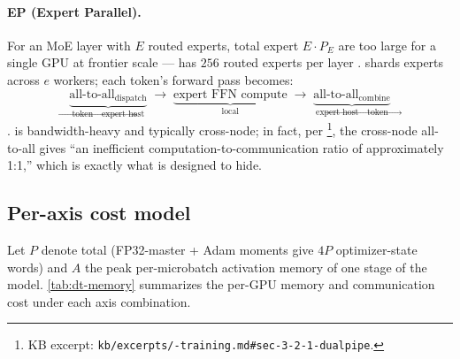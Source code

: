 \paragraph{EP (Expert Parallel).} For an MoE layer with $E$ routed
experts, total expert  $E \cdot P_E$ are too large for a
single GPU at frontier scale ---  has $256$ routed experts
per layer \citep[\S 3.2]{deepseek-v3}.  shards experts across $e$
workers; each token's forward pass becomes:
\begin{equation}
\underbrace{\text{all-to-all}_{\text{dispatch}}}_{\text{token}\to\text{expert host}}
\;\to\;
\underbrace{\text{expert FFN compute}}_{\text{local}}
\;\to\;
\underbrace{\text{all-to-all}_{\text{combine}}}_{\text{expert host}\to\text{token}}
\label{eq:ep-pattern}
\end{equation}
\citep[\S 3.2; \S 3.2.2]{deepseek-v3}.  is bandwidth-heavy and
typically cross-node; in fact, per
\citet[\S 3.2.1]{deepseek-v3}\footnote{KB excerpt:
\texttt{kb/excerpts/-training.md\#sec-3-2-1-dualpipe}.}, the
cross-node  all-to-all gives  ``an inefficient
computation-to-communication ratio of approximately 1:1,'' which is
exactly what  is designed to hide.

\subsection{Per-axis cost model}
\label{sec:dt-cost-model}

Let $P$ denote total  (FP32-master + Adam moments give $4P$
optimizer-state words) and $A$ the peak per-microbatch activation
memory of one stage of the model. \cref{tab:dt-memory} summarizes the
per-GPU memory and communication cost under each axis combination.

